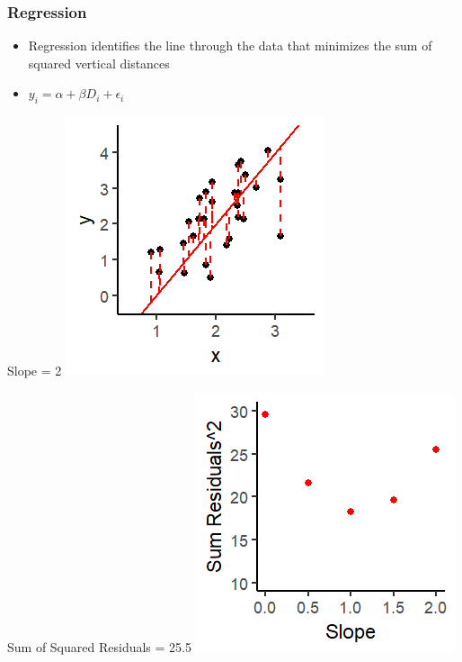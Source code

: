 \documentclass[xcolor=x11names,compress]{beamer}\usepackage[]{graphicx}\usepackage[]{color}
\makeatletter
\def\maxwidth{ %
  \ifdim\Gin@nat@width>\linewidth
    \linewidth
  \else
    \Gin@nat@width
  \fi
}
\newenvironment{knitrout}{}{} %
\renewcommand{\(}{\begin{columns}}
\renewcommand{\)}{\end{columns}}
\newcommand{\<}[1]{\begin{column}{#1}}
\renewcommand{\>}{\end{column}}
\makeatother
\begin{document}
\begin{frame}
\frametitle{Regression}
\begin{itemize}
\item Regression identifies the line through the data that minimizes the sum of squared vertical distances 
\item $y_i = \alpha + \beta D_i + \epsilon_i$
\end{itemize}
\begin{multicols}{2}
Slope = 2
\begin{knitrout}
\color{fgcolor}
\includegraphics[width=\maxwidth]{figure/graph_ols5-1} 

\end{knitrout}
\columnbreak
Sum of Squared Residuals = 25.5
\begin{knitrout}
\color{fgcolor}
\includegraphics[width=\maxwidth]{figure/graph_ssr5-1} 

\end{knitrout}
\end{multicols}
\end{frame}
\end{document}
